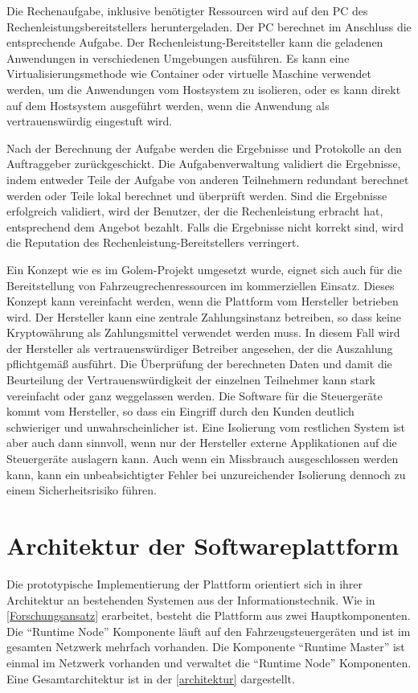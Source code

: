 Die Rechenaufgabe, inklusive benötigter Ressourcen wird auf den PC des Rechenleistungsbereitstellers heruntergeladen. Der PC berechnet im Anschluss die entsprechende Aufgabe. Der Rechenleistung-Bereitsteller kann die geladenen Anwendungen in verschiedenen Umgebungen ausführen. Es kann eine Virtualisierungsmethode wie Container oder virtuelle Maschine verwendet werden, um die Anwendungen vom Hostsystem zu isolieren, oder es kann direkt auf dem Hostsystem ausgeführt werden, wenn die Anwendung als vertrauenswürdig eingestuft wird. 

Nach der Berechnung der Aufgabe werden die Ergebnisse und Protokolle an den Auftraggeber zurückgeschickt. Die Aufgabenverwaltung validiert die Ergebnisse, indem entweder Teile der Aufgabe von anderen Teilnehmern redundant berechnet werden oder Teile lokal berechnet und überprüft werden. Sind die Ergebnisse erfolgreich validiert, wird der Benutzer, der die Rechenleistung erbracht hat, entsprechend dem Angebot bezahlt. Falls die Ergebnisse nicht korrekt sind, wird die Reputation des Rechenleistung-Bereitstellers verringert. 

Ein Konzept wie es im Golem-Projekt umgesetzt wurde, eignet sich auch für die Bereitstellung von Fahrzeugrechenressourcen im kommerziellen Einsatz. Dieses Konzept kann vereinfacht werden, wenn die Plattform vom Hersteller betrieben wird. Der Hersteller kann eine zentrale Zahlungsinstanz betreiben, so dass keine Kryptowährung als Zahlungsmittel verwendet werden muss. In diesem Fall wird der Hersteller als vertrauenswürdiger Betreiber angesehen, der die Auszahlung pflichtgemäß ausführt. Die Überprüfung der berechneten Daten und damit die Beurteilung der Vertrauenswürdigkeit der einzelnen Teilnehmer kann stark vereinfacht oder ganz weggelassen werden. Die Software für die Steuergeräte kommt vom Hersteller, so dass ein Eingriff durch den Kunden deutlich schwieriger und unwahrscheinlicher ist. Eine Isolierung vom restlichen System ist aber auch dann sinnvoll, wenn nur der Hersteller externe Applikationen auf die Steuergeräte auslagern kann. Auch wenn ein Missbrauch ausgeschlossen werden kann, kann ein unbeabsichtigter Fehler bei unzureichender Isolierung dennoch zu einem Sicherheitsrisiko führen. 

\section{Architektur der Softwareplattform}

Die prototypische Implementierung der Plattform orientiert sich in ihrer Architektur an bestehenden Systemen aus der Informationstechnik. Wie in \autoref{Forschungsansatz} erarbeitet, besteht die Plattform aus zwei Hauptkomponenten. Die \enquote{Runtime Node} Komponente läuft auf den Fahrzeugsteuergeräten und ist im gesamten Netzwerk mehrfach vorhanden. Die Komponente \enquote{Runtime Master} ist einmal im Netzwerk vorhanden und verwaltet die \enquote{Runtime Node} Komponenten. Eine Gesamtarchitektur ist in der \autoref{architektur} dargestellt.

